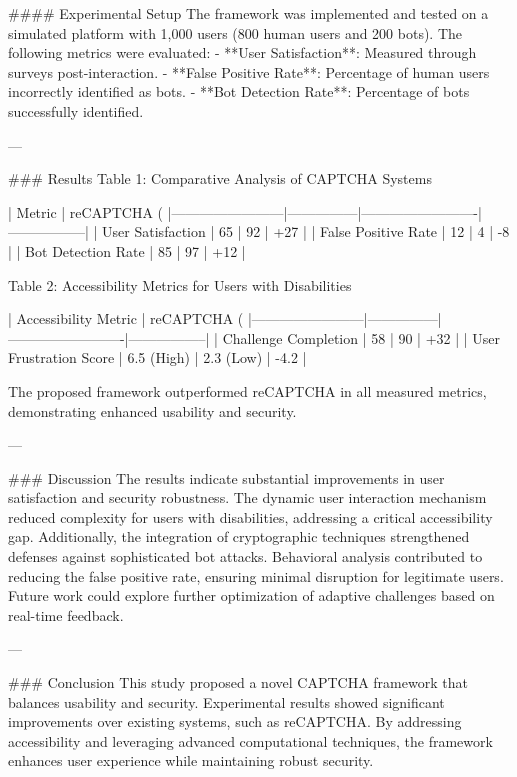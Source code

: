 #### Experimental Setup  
The framework was implemented and tested on a simulated platform with 1,000 users (800 human users and 200 bots). The following metrics were evaluated:  
- **User Satisfaction**: Measured through surveys post-interaction.  
- **False Positive Rate**: Percentage of human users incorrectly identified as bots.  
- **Bot Detection Rate**: Percentage of bots successfully identified.

---

### Results  
Table 1: Comparative Analysis of CAPTCHA Systems  

| Metric                 | reCAPTCHA (%
|------------------------|---------------|-------------------------|-----------------|
| User Satisfaction      | 65            | 92                      | +27             |
| False Positive Rate    | 12            | 4                       | -8              |
| Bot Detection Rate     | 85            | 97                      | +12             |

Table 2: Accessibility Metrics for Users with Disabilities  

| Accessibility Metric   | reCAPTCHA (%
|------------------------|---------------|-------------------------|-----------------|
| Challenge Completion   | 58            | 90                      | +32             |
| User Frustration Score | 6.5 (High)    | 2.3 (Low)               | -4.2            |

The proposed framework outperformed reCAPTCHA in all measured metrics, demonstrating enhanced usability and security.

---

### Discussion  
The results indicate substantial improvements in user satisfaction and security robustness. The dynamic user interaction mechanism reduced complexity for users with disabilities, addressing a critical accessibility gap. Additionally, the integration of cryptographic techniques strengthened defenses against sophisticated bot attacks. Behavioral analysis contributed to reducing the false positive rate, ensuring minimal disruption for legitimate users. Future work could explore further optimization of adaptive challenges based on real-time feedback.

---

### Conclusion  
This study proposed a novel CAPTCHA framework that balances usability and security. Experimental results showed significant improvements over existing systems, such as reCAPTCHA. By addressing accessibility and leveraging advanced computational techniques, the framework enhances user experience while maintaining robust security.

